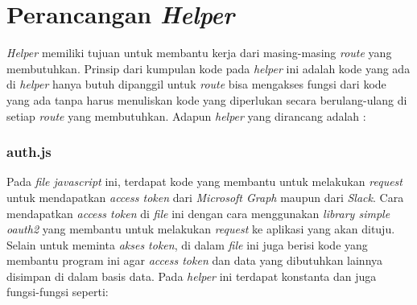 \section{Perancangan \textit{Helper}}
\textit{Helper} memiliki tujuan untuk membantu kerja dari masing-masing \textit{route} yang membutuhkan. Prinsip dari kumpulan kode pada \textit{helper} ini adalah kode yang ada di \textit{helper} hanya butuh dipanggil untuk \textit{route} bisa mengakses fungsi dari kode yang ada tanpa harus menuliskan kode yang diperlukan secara berulang-ulang di setiap \textit{route} yang membutuhkan. Adapun \textit{helper} yang dirancang adalah :

\subsubsection{auth.js}
Pada \textit{file javascript} ini, terdapat kode yang membantu untuk melakukan \textit{request} untuk mendapatkan \textit{access token} dari \textit{Microsoft Graph} maupun dari \textit{Slack}. Cara mendapatkan \textit{access token} di \textit{file} ini dengan cara menggunakan \textit{library simple oauth2} yang membantu untuk melakukan \textit{request} ke aplikasi yang akan dituju. Selain untuk meminta \textit{akses token}, di dalam \textit{file} ini juga berisi kode yang membantu program ini agar \textit{access token} dan data yang dibutuhkan lainnya disimpan di dalam basis data. Pada \textit{helper} ini terdapat konstanta dan juga fungsi-fungsi seperti:
